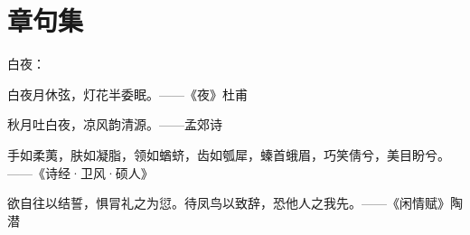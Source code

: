 \section{章句集}

白夜：

白夜月休弦，灯花半委眠。——《夜》杜甫

秋月吐白夜，凉风韵清源。——孟郊诗

\vspace*{2\ccwd}

手如柔荑，肤如凝脂，领如蝤蛴，齿如瓠犀，螓首蛾眉，巧笑倩兮，美目盼兮。——《诗经·卫风·硕人》

\vspace*{2\ccwd}

欲自往以结誓，惧冐礼之为愆。待凤鸟以致辞，恐他人之我先。——《闲情赋》陶潜



\newpage